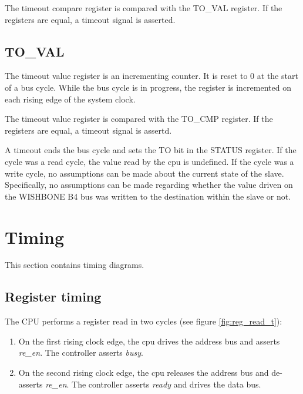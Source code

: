 \documentclass[a4paper,twocolumn,12pt]{article}
\begin{document}
The timeout compare register is compared with the TO\_VAL register. If the registers are equal, a timeout signal is asserted.

\subsection{TO\_VAL}

The timeout value register is an incrementing counter. It is reset to 0 at the start of a bus cycle. While the bus cycle is in progress, the register is incremented on each rising edge of the system clock.

The timeout value register is compared with the TO\_CMP register. If the registers are equal, a timeout signal is assertd. 

A timeout ends the bus cycle and sets the TO bit in the STATUS register. If the cycle was a read cycle, the value read by the cpu is undefined. If the cycle was a write cycle, no assumptions can be made about the current state of the slave. Specifically, no assumptions can be made regarding whether the value driven on the WISHBONE B4 bus was written to the destination within the slave or not.

\section{Timing}

This section contains timing diagrams.

\subsection{Register timing}

The CPU performs a register read in two cycles (see figure \ref{fig:reg_read_t}):

\begin{enumerate}
    \item On the first rising clock edge, the cpu drives the address bus and asserts \emph{re\_en}. The controller asserts \emph{busy}.
    \item On the second rising clock edge, the cpu releases the address bus and de-asserts \emph{re\_en}. The controller asserts \emph{ready} and drives the data bus.
\end{enumerate}
\end{document}
